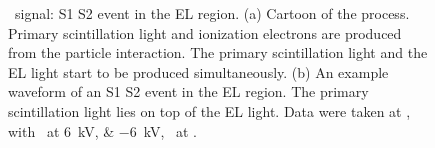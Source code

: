 \begin{figure}[!htbp]
\begin{subfigure}[b]{0.7\textwidth}
		\caption{}
		\label{fig:EL rad event a}
	\end{subfigure}

	\caption[\gtest\ signal: S1 S2 event in the EL region.]{\gtest\ signal: S1 S2 event in the EL region. (a) Cartoon of the process. Primary scintillation light and ionization electrons are produced from the particle interaction. The primary scintillation light and the EL light start to be produced simultaneously. (b) An example waveform of an S1 S2 event in the EL region. The primary scintillation light lies on top of the EL light. %
		Data were taken at , with \opvtvb\ at \SIlist{+6;-6}{kV}, \opgd\ at \standarddensity .%
	}
	\label{fig:EL rad event}
\end{figure}

